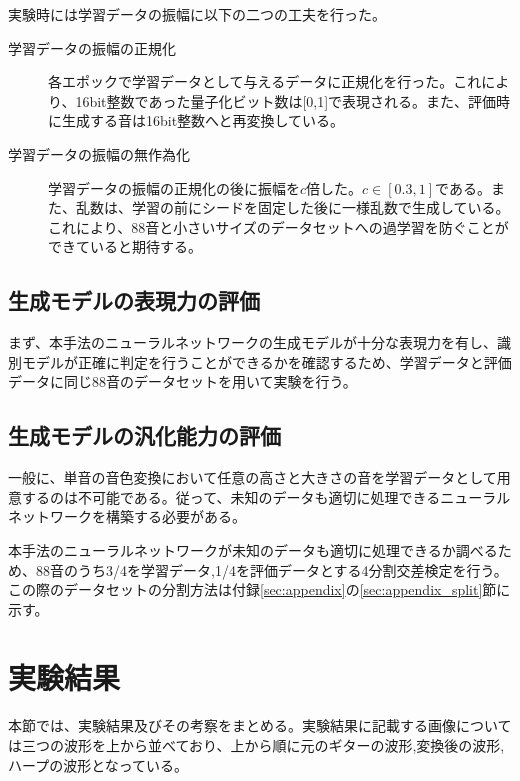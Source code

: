 実験時には学習データの振幅に以下の二つの工夫を行った。

\begin{description}

\item[学習データの振幅の正規化]\mbox{}

各エポックで学習データとして与えるデータに正規化を行った。これにより、16bit整数であった量子化ビット数は[0,1]で表現される。また、評価時に生成する音は16bit整数へと再変換している。

\item[学習データの振幅の無作為化]\mbox{}

学習データの振幅の正規化の後に振幅を$c$倍した。$c \in [0.3,1]$である。また、乱数は、学習の前にシードを固定した後に一様乱数で生成している。これにより、88音と小さいサイズのデータセットへの過学習を防ぐことができていると期待する。

\end{description}

\subsection{生成モデルの表現力の評価}

まず、本手法のニューラルネットワークの生成モデルが十分な表現力を有し、識別モデルが正確に判定を行うことができるかを確認するため、学習データと評価データに同じ88音のデータセットを用いて実験を行う。

\subsection{生成モデルの汎化能力の評価}

一般に、単音の音色変換において任意の高さと大きさの音を学習データとして用意するのは不可能である。従って、未知のデータも適切に処理できるニューラルネットワークを構築する必要がある。

本手法のニューラルネットワークが未知のデータも適切に処理できるか調べるため、88音のうち3/4を学習データ,1/4を評価データとする4分割交差検定を行う。この際のデータセットの分割方法は付録\ref{sec:appendix}の\ref{sec:appendix_split}節に示す。

\section{実験結果}

本節では、実験結果及びその考察をまとめる。実験結果に記載する画像については三つの波形を上から並べており、上から順に元のギターの波形,変換後の波形,ハープの波形となっている。

